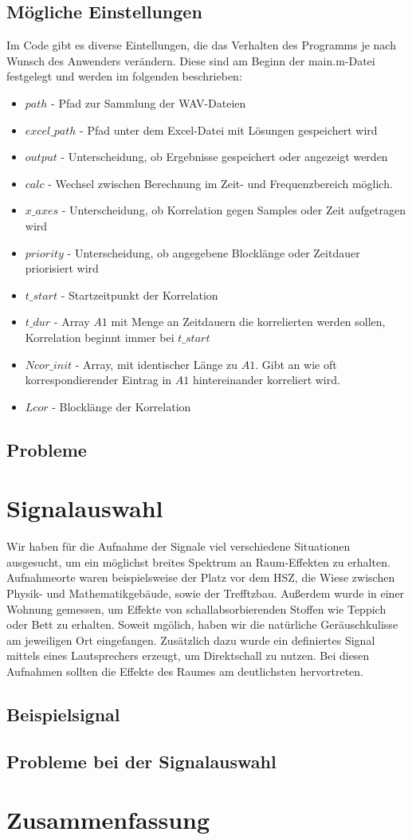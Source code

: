 \subsection{Mögliche Einstellungen}
Im Code gibt es diverse Eintellungen, die das Verhalten des Programms je nach Wunsch des Anwenders verändern. Diese sind am Beginn der main.m-Datei festgelegt und werden im folgenden beschrieben:
\begin{itemize} 
\item $path$ - Pfad zur Sammlung der WAV-Dateien
\item $excel\_path$ - Pfad unter dem Excel-Datei mit Lösungen gespeichert wird
\item $output$ - Unterscheidung, ob Ergebnisse gespeichert oder angezeigt werden
\item $calc$ - Wechsel zwischen Berechnung im Zeit- und Frequenzbereich möglich.
\item $x\_axes$ - Unterscheidung, ob Korrelation gegen Samples oder Zeit aufgetragen wird
\item $priority$ - Unterscheidung, ob angegebene Blocklänge oder Zeitdauer priorisiert wird
\item $t\_start$ - Startzeitpunkt der Korrelation
\item $t\_dur$ - Array $A1$ mit Menge an Zeitdauern die korrelierten werden sollen, Korrelation beginnt immer bei $t\_start$
\item $Ncor\_init$ - Array, mit identischer Länge zu $A1$. Gibt an wie oft korrespondierender Eintrag in $A1$ hintereinander korreliert wird. 
\item $Lcor$ - Blocklänge der Korrelation
\end{itemize}
\subsection{Probleme} 


\section{Signalauswahl}
Wir haben für die Aufnahme der Signale viel verschiedene Situationen ausgesucht, um ein möglichst breites Spektrum an Raum-Effekten zu erhalten. Aufnahmeorte waren beispielsweise der Platz vor dem HSZ, die Wiese zwischen Physik- und Mathematikgebäude, sowie der Trefftzbau. Außerdem wurde in einer Wohnung gemessen, um Effekte von schallabsorbierenden Stoffen wie Teppich oder Bett zu erhalten. Soweit mgölich, haben wir die natürliche Geräuschkulisse am jeweiligen Ort eingefangen. Zusätzlich dazu wurde ein definiertes Signal mittels eines Lautsprechers erzeugt, um Direktschall zu nutzen. Bei diesen Aufnahmen sollten die Effekte des Raumes am deutlichsten hervortreten.
\subsection{Beispielsignal}
\subsection{Probleme bei der Signalauswahl}

\section{Zusammenfassung}
